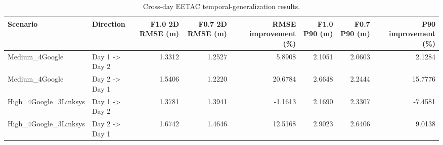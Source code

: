 \begin{table}
\caption{Cross-day EETAC temporal-generalization results.}
\label{tab:cross_day}
\begin{tabular}{llrrrrrr}
\toprule
Scenario & Direction & F1.0 2D RMSE (m) & F0.7 2D RMSE (m) & RMSE improvement (\%) & F1.0 P90 (m) & F0.7 P90 (m) & P90 improvement (\%) \\
\midrule
Medium\_4Google & Day 1 -> Day 2 & 1.3312 & 1.2527 & 5.8908 & 2.1051 & 2.0603 & 2.1284 \\
Medium\_4Google & Day 2 -> Day 1 & 1.5406 & 1.2220 & 20.6784 & 2.6648 & 2.2444 & 15.7776 \\
High\_4Google\_3Linksys & Day 1 -> Day 2 & 1.3781 & 1.3941 & -1.1613 & 2.1690 & 2.3307 & -7.4581 \\
High\_4Google\_3Linksys & Day 2 -> Day 1 & 1.6742 & 1.4646 & 12.5168 & 2.9023 & 2.6406 & 9.0138 \\
\bottomrule
\end{tabular}
\end{table}
